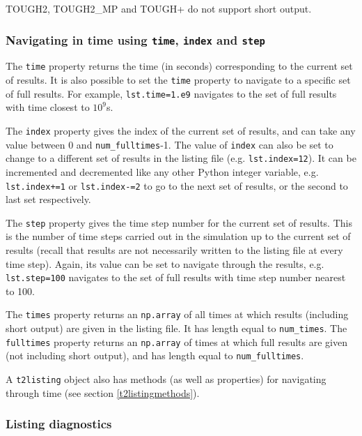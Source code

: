 TOUGH2, TOUGH2\_MP and TOUGH+ do not support short output.

\subsubsection{Navigating in time using \texttt{time}, \texttt{index} and \texttt{step}}

The \texttt{time} property returns the time (in seconds) corresponding to the current set of results.  It is also possible to set the \texttt{time} property to navigate to a specific set of full results.  For example, \texttt{lst.time=1.e9} navigates to the set of full results with time closest to $10^9$s.

The \texttt{index} property gives the index of the current set of results, and can take any value between 0 and \texttt{num\_fulltimes}-1.  The value of \texttt{index} can also be set to change to a different set of results in the listing file (e.g. \texttt{lst.index=12}).  It can be incremented and decremented like any other Python integer variable, e.g. \texttt{lst.index+=1} or \texttt{lst.index-=2} to go to the next set of results, or the second to last set respectively.

The \texttt{step} property gives the time step number for the current set of results.  This is the number of time steps carried out in the simulation up to the current set of results (recall that results are not necessarily written to the listing file at every time step).  Again, its value can be set to navigate through the results, e.g. \texttt{lst.step=100} navigates to the set of full results with time step number nearest to 100.

The \texttt{times} property returns an \texttt{np.array} of all times at which results (including short output) are given in the listing file.  It has length equal to \texttt{num\_times}.  The \texttt{fulltimes} property returns an \texttt{np.array} of times at which full results are given (not including short output), and has length equal to \texttt{num\_fulltimes}.

A \texttt{t2listing} object also has methods (as well as properties) for navigating through time (see section \ref{t2listingmethods}).

\subsubsection{Listing diagnostics}


